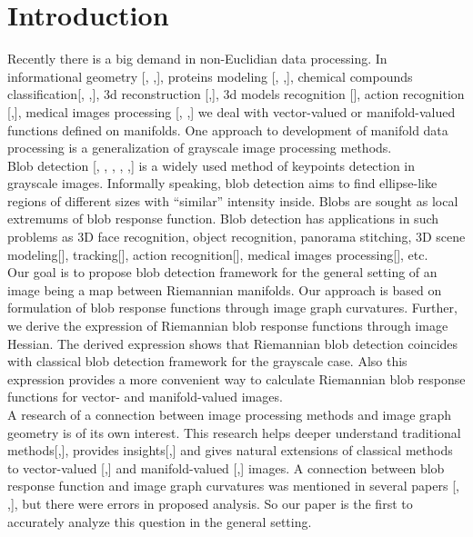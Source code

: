 \documentclass{llncs}
\begin{document}
\section{Introduction}
%
Recently there is a big demand in non-Euclidian data processing. In informational geometry [, ,], proteins modeling [, ,], chemical compounds classification[, ,], 3d reconstruction [,], 3d models recognition [], action recognition [,], medical images processing [, ,] we deal with vector-valued or manifold-valued functions defined on manifolds. One approach to development of manifold data processing is a generalization of grayscale image processing methods. 
\\
Blob detection [, , , , ,] is a widely used method of keypoints detection in grayscale images. Informally speaking, blob detection aims to find ellipse-like regions of different sizes with “similar” intensity inside. Blobs are sought as local extremums of blob response function. Blob detection has applications in such problems as 3D face recognition, object recognition, panorama stitching, 3D scene modeling[], tracking[], action recognition[], medical images processing[], etc.
\\
Our goal is to propose blob detection framework for the general setting of an image being a map between Riemannian manifolds. Our approach is based on formulation of blob response functions through image graph curvatures. Further, we derive the expression of Riemannian blob response functions through image Hessian. The derived expression shows that Riemannian blob detection coincides with classical blob detection framework for the grayscale case. Also this expression provides a more convenient way to calculate Riemannian blob response functions for vector- and manifold-valued images.
\\
A research of a connection between image processing methods and image graph geometry is of its own interest. This research helps deeper understand traditional methods[,], provides insights[,] and gives natural extensions of classical methods to vector-valued [,] and manifold-valued [,] images. A connection between blob response function and image graph curvatures was mentioned in several papers [, ,], but there were errors in proposed analysis. So our paper is the first to accurately analyze this question in the general setting.
\end{document}
